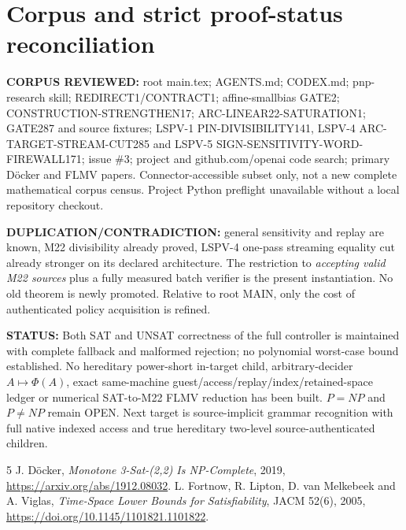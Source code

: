 \documentclass[11pt]{article}
\begin{document}
\section{Corpus and strict proof-status reconciliation}
\noindent\textbf{CORPUS REVIEWED:} root main.tex; AGENTS.md; CODEX.md; pnp-research skill; REDIRECT1/CONTRACT1; affine-smallbias GATE2; CONSTRUCTION-STRENGTHEN17; ARC-LINEAR22-SATURATION1; GATE287 and source fixtures; LSPV-1 PIN-DIVISIBILITY141, LSPV-4 ARC-TARGET-STREAM-CUT285 and LSPV-5 SIGN-SENSITIVITY-WORD-FIREWALL171; issue \#3; project and github.com/openai code search; primary D\"ocker and FLMV papers. Connector-accessible subset only, not a new complete mathematical corpus census. Project Python preflight unavailable without a local repository checkout.
\par\noindent\textbf{DUPLICATION/CONTRADICTION:} general sensitivity and replay are known, M22 divisibility already proved, LSPV-4 one-pass streaming equality cut already stronger on its declared architecture. The restriction to \emph{accepting valid M22 sources} plus a fully measured batch verifier is the present instantiation. No old theorem is newly promoted. Relative to root MAIN, only the cost of authenticated policy acquisition is refined.
\par\noindent\textbf{STATUS:} Both SAT and UNSAT correctness of the full controller is maintained with complete fallback and malformed rejection; no polynomial worst-case bound established. No hereditary power-short in-target child, arbitrary-decider $A\mapsto\Phi(A)$, exact same-machine guest/access/replay/index/retained-space ledger or numerical SAT-to-M22 FLMV reduction has been built. $P=NP$ and $P\ne NP$ remain OPEN. Next target is source-implicit grammar recognition with full native indexed access and true hereditary two-level source-authenticated children.
\begin{thebibliography}{5}
 J. D\"ocker, \emph{Monotone 3-Sat-(2,2) Is NP-Complete}, 2019, \url{https://arxiv.org/abs/1912.08032}.
 L. Fortnow, R. Lipton, D. van Melkebeek and A. Viglas, \emph{Time-Space Lower Bounds for Satisfiability}, JACM 52(6), 2005, \url{https://doi.org/10.1145/1101821.1101822}.
\end{thebibliography}
\end{document}

